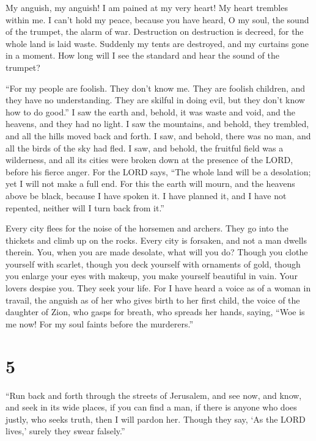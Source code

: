  My anguish, my anguish! I am pained at my very heart! My
heart trembles within me. I can't hold my peace, because you have heard,
O my soul, the sound of the trumpet, the alarm of war. 
Destruction on destruction is decreed, for the whole land is laid waste.
Suddenly my tents are destroyed, and my curtains gone in a moment.
 How long will I see the standard and hear the sound of the
trumpet?

 ``For my people are foolish. They don't know me. They are
foolish children, and they have no understanding. They are skilful in
doing evil, but they don't know how to do good.''  I saw
the earth and, behold, it was waste and void, and the heavens, and they
had no light.  I saw the mountains, and behold, they
trembled, and all the hills moved back and forth.  I saw,
and behold, there was no man, and all the birds of the sky had fled.
 I saw, and behold, the fruitful field was a wilderness,
and all its cities were broken down at the presence of the LORD, before
his fierce anger.  For the LORD says, ``The whole land will
be a desolation; yet I will not make a full end.  For this
the earth will mourn, and the heavens above be black, because I have
spoken it. I have planned it, and I have not repented, neither will I
turn back from it.''

 Every city flees for the noise of the horsemen and
archers. They go into the thickets and climb up on the rocks. Every city
is forsaken, and not a man dwells therein.  You, when you
are made desolate, what will you do? Though you clothe yourself with
scarlet, though you deck yourself with ornaments of gold, though you
enlarge your eyes with makeup, you make yourself beautiful in vain. Your
lovers despise you. They seek your life.  For I have heard
a voice as of a woman in travail, the anguish as of her who gives birth
to her first child, the voice of the daughter of Zion, who gasps for
breath, who spreads her hands, saying, ``Woe is me now! For my soul
faints before the murderers.''

\hypertarget{section-4}{%
\section{5}\label{section-4}}

 ``Run back and forth through the streets of Jerusalem, and
see now, and know, and seek in its wide places, if you can find a man,
if there is anyone who does justly, who seeks truth, then I will pardon
her.  Though they say, `As the LORD lives,' surely they
swear falsely.''

